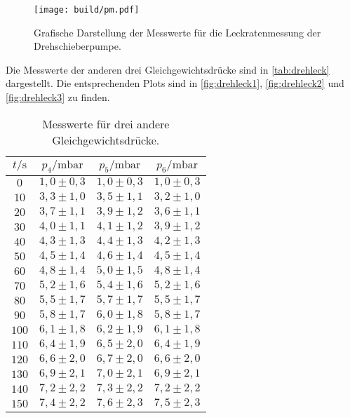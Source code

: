 \begin{figure}[H]
  \centering
  \texttt{[image: build/pm.pdf]}
  \caption{Grafische Darstellung der Messwerte für die Leckratenmessung der Drehschieberpumpe.}
  \label{fig:pm}
\end{figure}

Die Messwerte der anderen drei Gleichgewichtsdrücke sind in \autoref{tab:drehleck} dargestellt. Die entsprechenden
Plots sind in \autoref{fig:drehleck1}, \autoref{fig:drehleck2} und \autoref{fig:drehleck3} zu finden.

\begin{table}[H]
  \centering
  \caption{Messwerte für drei andere Gleichgewichtsdrücke.}
  \label{tab:drehleck}
  \begin{tabular}{c c c c}
    \toprule
    $t/\si{\second}$ & $p_4 /\si{\milli\bar}$ & $p_5 /\si{\milli\bar}$ & $p_6 /\si{\milli\bar}$ \\
    \midrule
    $  0$ & $ 1,0 \pm 0,3 $ & $ 1,0 \pm 0,3 $ & $ 1,0 \pm 0,3 $ \\ 
    $ 10$ & $ 3,3 \pm 1,0 $ & $ 3,5 \pm 1,1 $ & $ 3,2 \pm 1,0 $ \\ 
    $ 20$ & $ 3,7 \pm 1,1 $ & $ 3,9 \pm 1,2 $ & $ 3,6 \pm 1,1 $ \\ 
    $ 30$ & $ 4,0 \pm 1,1 $ & $ 4,1 \pm 1,2 $ & $ 3,9 \pm 1,2 $ \\ 
    $ 40$ & $ 4,3 \pm 1,3 $ & $ 4,4 \pm 1,3 $ & $ 4,2 \pm 1,3 $ \\ 
    $ 50$ & $ 4,5 \pm 1,4 $ & $ 4,6 \pm 1,4 $ & $ 4,5 \pm 1,4 $ \\ 
    $ 60$ & $ 4,8 \pm 1,4 $ & $ 5,0 \pm 1,5 $ & $ 4,8 \pm 1,4 $ \\ 
    $ 70$ & $ 5,2 \pm 1,6 $ & $ 5,4 \pm 1,6 $ & $ 5,2 \pm 1,6 $ \\ 
    $ 80$ & $ 5,5 \pm 1,7 $ & $ 5,7 \pm 1,7 $ & $ 5,5 \pm 1,7 $ \\ 
    $ 90$ & $ 5,8 \pm 1,7 $ & $ 6,0 \pm 1,8 $ & $ 5,8 \pm 1,7 $ \\ 
    $100$ & $ 6,1 \pm 1,8 $ & $ 6,2 \pm 1,9 $ & $ 6,1 \pm 1,8 $ \\ 
    $110$ & $ 6,4 \pm 1,9 $ & $ 6,5 \pm 2,0 $ & $ 6,4 \pm 1,9 $ \\ 
    $120$ & $ 6,6 \pm 2,0 $ & $ 6,7 \pm 2,0 $ & $ 6,6 \pm 2,0 $ \\ 
    $130$ & $ 6,9 \pm 2,1 $ & $ 7,0 \pm 2,1 $ & $ 6,9 \pm 2,1 $ \\ 
    $140$ & $ 7,2 \pm 2,2 $ & $ 7,3 \pm 2,2 $ & $ 7,2 \pm 2,2 $ \\ 
    $150$ & $ 7,4 \pm 2,2 $ & $ 7,6 \pm 2,3 $ & $ 7,5 \pm 2,3 $ \\ 

\end{tabular}
\end{table}

